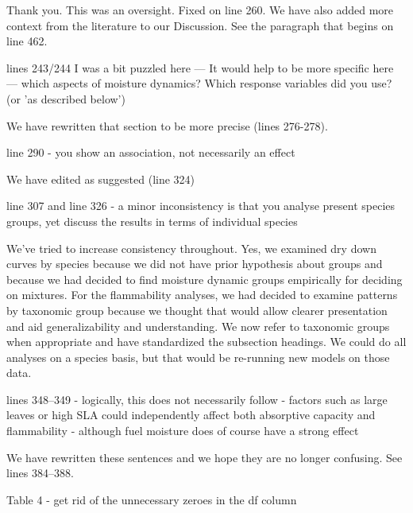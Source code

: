 \documentclass[letterpaper, 12pt]{letter}
\begin{document}
\begin{letter}{}
Thank you. This was an oversight. Fixed on line 260. We have also added more
context from the literature to our Discussion. See the paragraph that begins on
line 462.


\begin{quoting}
  lines 243/244 I was a bit puzzled here --- It would help to be more specific
  here --- which aspects of moisture dynamics? Which response variables did you
  use? (or 'as described below')
\end{quoting}

We have rewritten that section to be more precise (lines 276-278). 

\begin{quoting}
line 290 - you show an association, not necessarily an effect
\end{quoting}

We have edited as suggested (line 324)

\begin{quoting}
  line 307 and line 326 - a minor inconsistency is that you analyse present
  species groups, yet discuss the results in terms of individual species
\end{quoting}

We've tried to increase consistency throughout. Yes, we examined dry down
curves by species because we did not have prior hypothesis about groups and
because we had decided to find moisture dynamic groups empirically for deciding
on mixtures. For the flammability analyses, we had decided to examine patterns
by taxonomic group because we thought that would allow clearer presentation and
aid generalizability and understanding. We now refer to taxonomic groups when
appropriate and have standardized the subsection headings. We could do all
analyses on a species basis, but that would be re-running new models on those
data.

\begin{quoting}
  lines 348--349 - logically, this does not necessarily follow - factors such as
  large leaves or high SLA could independently affect both absorptive capacity
  and flammability - although fuel moisture does of course have a strong effect
\end{quoting}

We have rewritten these sentences and we hope they are no longer confusing. See
lines 384--388.

\begin{quoting}
Table 4 - get rid of the unnecessary zeroes in the df column
\end{quoting}


\end{letter}
\end{document}
